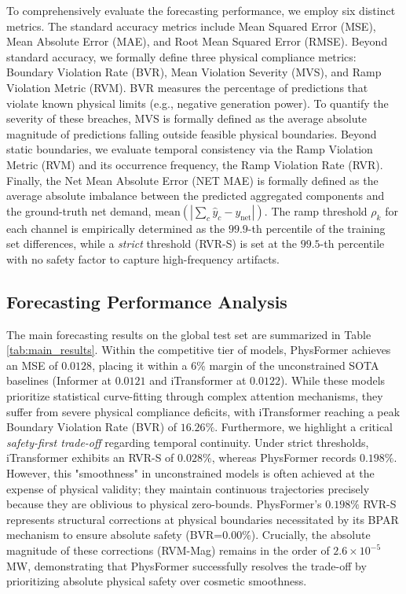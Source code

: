 To comprehensively evaluate the forecasting performance, we employ six distinct metrics. The standard accuracy metrics include Mean Squared Error (MSE), Mean Absolute Error (MAE), and Root Mean Squared Error (RMSE). Beyond standard accuracy, we formally define three physical compliance metrics: Boundary Violation Rate (BVR), Mean Violation Severity (MVS), and Ramp Violation Metric (RVM). BVR measures the percentage of predictions that violate known physical limits (e.g., negative generation power). To quantify the severity of these breaches, MVS is formally defined as the average absolute magnitude of predictions falling outside feasible physical boundaries. Beyond static boundaries, we evaluate temporal consistency via the Ramp Violation Metric (RVM) and its occurrence frequency, the Ramp Violation Rate (RVR). Finally, the Net Mean Absolute Error (NET MAE) is formally defined as the average absolute imbalance between the predicted aggregated components and the ground-truth net demand, $\text{mean}(|\sum_c \hat{y}_c - y_{\text{net}}|)$. The ramp threshold $\rho_k$ for each channel is empirically determined as the $99.9$-th percentile of the training set differences, while a \textit{strict} threshold (RVR-S) is set at the $99.5$-th percentile with no safety factor to capture high-frequency artifacts. 

\subsection{Forecasting Performance Analysis}
\label{subsec:performance}

The main forecasting results on the global test set are summarized in Table \ref{tab:main_results}. Within the competitive tier of models, PhysFormer achieves an MSE of $0.0128$, placing it within a 6\% margin of the unconstrained SOTA baselines (Informer at $0.0121$ and iTransformer at $0.0122$). While these models prioritize statistical curve-fitting through complex attention mechanisms, they suffer from severe physical compliance deficits, with iTransformer reaching a peak Boundary Violation Rate (BVR) of $16.26\%$. Furthermore, we highlight a critical \textit{safety-first trade-off} regarding temporal continuity. Under strict thresholds, iTransformer exhibits an RVR-S of $0.028\%$, whereas PhysFormer records $0.198\%$. However, this "smoothness" in unconstrained models is often achieved at the expense of physical validity; they maintain continuous trajectories precisely because they are oblivious to physical zero-bounds. PhysFormer's $0.198\%$ RVR-S represents structural corrections at physical boundaries necessitated by its BPAR mechanism to ensure absolute safety (BVR=0.00\%). Crucially, the absolute magnitude of these corrections (RVM-Mag) remains in the order of $2.6 \times 10^{-5}$ MW, demonstrating that PhysFormer successfully resolves the trade-off by prioritizing absolute physical safety over cosmetic smoothness.

